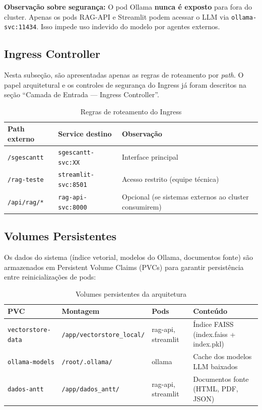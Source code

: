 \documentclass[12pt, a4paper]{article}
\begin{document}
\noindent\textbf{Observação sobre segurança:} O pod Ollama \textbf{nunca é exposto} para fora do cluster. Apenas os pods RAG-API e Streamlit podem acessar o LLM via \texttt{ollama-svc:11434}. Isso impede uso indevido do modelo por agentes externos.

\subsection{Ingress Controller}

Nesta subseção, são apresentadas apenas as regras de roteamento por \textit{path}. O papel arquitetural e os controles de segurança do Ingress já foram descritos na seção ``Camada de Entrada --- Ingress Controller''.

\begin{table}[H]
\centering
\small
\caption{Regras de roteamento do Ingress}
\label{tab:ingress}
\begin{tabular}{l l l}
\toprule
\textbf{Path externo} & \textbf{Service destino} & \textbf{Observação} \\
\midrule
\texttt{/sgescantt} & \texttt{sgescantt-svc:XX} & Interface principal \\
\texttt{/rag-teste} & \texttt{streamlit-svc:8501} & Acesso restrito (equipe técnica) \\
\texttt{/api/rag/*} & \texttt{rag-api-svc:8000} & Opcional (se sistemas externos ao cluster consumirem) \\
\bottomrule
\end{tabular}
\end{table}

\subsection{Volumes Persistentes}

Os dados do sistema (índice vetorial, modelos do Ollama, documentos fonte) são armazenados em Persistent Volume Claims (PVCs) para garantir persistência entre reinicializações de pods:

\begin{table}[H]
\centering
\small
\caption{Volumes persistentes da arquitetura}
\label{tab:volumes}
\begin{tabularx}{\textwidth}{l l l X}
\toprule
\textbf{PVC} & \textbf{Montagem} & \textbf{Pods} & \textbf{Conteúdo} \\
\midrule
\texttt{vectorstore-data} & \texttt{/app/vectorstore\_local/} & rag-api, streamlit & Índice FAISS (index.faiss + index.pkl) \\
\texttt{ollama-models} & \texttt{/root/.ollama/} & ollama & Cache dos modelos LLM baixados \\
\texttt{dados-antt} & \texttt{/app/dados\_antt/} & rag-api, streamlit & Documentos fonte (HTML, PDF, JSON) \\
\bottomrule
\end{tabularx}
\end{table}
\end{document}
